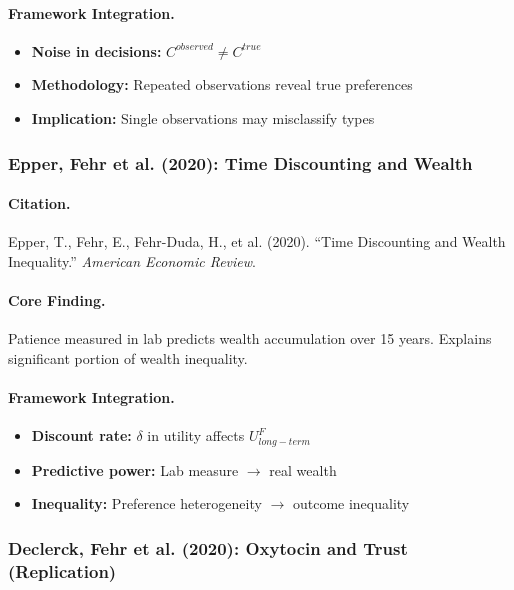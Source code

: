 \paragraph{Framework Integration.}
\begin{itemize}
  \item \textbf{Noise in decisions:} $C^{observed} \neq C^{true}$
  \item \textbf{Methodology:} Repeated observations reveal true preferences
  \item \textbf{Implication:} Single observations may misclassify types
\end{itemize}

\subsubsection{Epper, Fehr et al. (2020): Time Discounting and Wealth}

\paragraph{Citation.}
Epper, T., Fehr, E., Fehr-Duda, H., et al. (2020).
``Time Discounting and Wealth Inequality.''
\emph{American Economic Review}.

\paragraph{Core Finding.}
Patience measured in lab predicts wealth accumulation over 15 years.
Explains significant portion of wealth inequality.

\paragraph{Framework Integration.}
\begin{itemize}
  \item \textbf{Discount rate:} $\delta$ in utility affects $U^F_{long-term}$
  \item \textbf{Predictive power:} Lab measure $\to$ real wealth
  \item \textbf{Inequality:} Preference heterogeneity $\to$ outcome inequality
\end{itemize}

\subsubsection{Declerck, Fehr et al. (2020): Oxytocin and Trust (Replication)}


